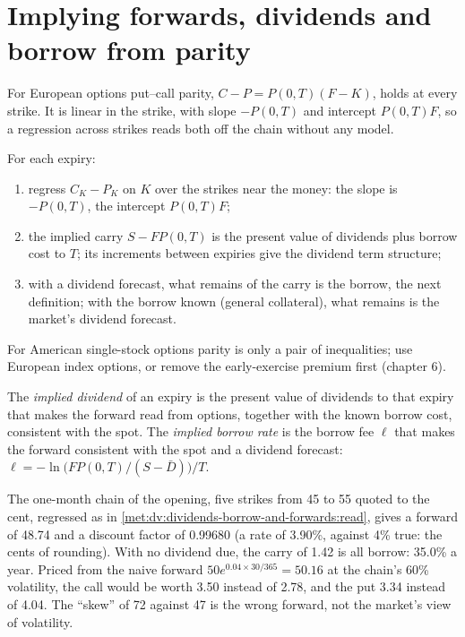 \section{Implying forwards, dividends and borrow from parity}

For European options put--call parity, $C-P=P(0,T)(F-K)$, holds at every strike.
It is linear in the strike, with slope $-P(0,T)$ and intercept $P(0,T)F$, so a
regression across strikes reads both off the chain without any model.

\begin{method}\label{met:dv:dividends-borrow-and-forwards:read}
For each expiry:
\begin{enumerate}
\item regress $C_K-P_K$ on $K$ over the strikes near the money: the slope is
$-P(0,T)$, the intercept $P(0,T)F$;
\item the implied carry $S-FP(0,T)$ is the present value of dividends plus borrow
cost to $T$; its increments between expiries give the dividend term structure;
\item with a dividend forecast, what remains of the carry is the borrow, the next
definition; with the borrow known (general collateral), what remains is the market's
dividend forecast.
\end{enumerate}
For American single-stock options parity is only a pair of inequalities; use
European index options, or remove the early-exercise premium first (chapter 6).
\end{method}

\begin{definition}\label{def:dv:dividends-borrow-and-forwards:implied}
The \emph{implied dividend} of an expiry is the present value
of dividends to that expiry that makes the forward read from options, together with
the known borrow cost, consistent with the spot. The \emph{implied borrow
rate} is the borrow fee $\ell$ that makes the forward
consistent with the spot and a dividend forecast:
$\ell=-\ln\bigl(FP(0,T)/(S-\bar D)\bigr)/T$.
\end{definition}

\begin{example}\label{ex:dv:dividends-borrow-and-forwards:htb}
The one-month chain of the opening, five strikes from 45 to 55 quoted to the cent,
regressed as in \cref{met:dv:dividends-borrow-and-forwards:read}, gives a forward of
48.74 and a discount factor of 0.99680 (a rate of 3.90\%, against 4\% true: the
cents of rounding). With no dividend due, the carry of 1.42 is all borrow: 35.0\% a
year. Priced from the naive forward $50e^{0.04\times30/365}=50.16$ at the chain's 60\%
volatility, the call would be worth 3.50 instead of 2.78, and the put 3.34 instead of
4.04. The ``skew'' of 72 against 47 is the wrong forward, not the market's view of
volatility.
\end{example}

